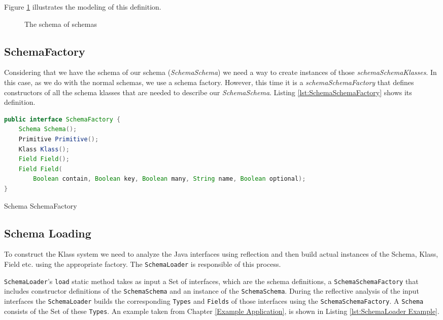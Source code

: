 Figure \ref{fig:SchemaSchema_definition} illustrates the modeling of this definition.

\begin{figure}[H]
	\centering
  	\caption{The schema of schemas}
  	\label{fig:SchemaSchema_definition}
\end{figure}

\subsection{SchemaFactory}\label{sec:SchemaFactory}
Considering that we have the schema of our schema (\textit{SchemaSchema}) we need a way to create instances of those \textit{schemaSchemaKlasses}.
In this case, as we do with the normal schemas, we use a schema factory. 
However, this time it is a \textit{schemaSchemaFactory} that defines constructors of all the schema klasses that are needed to describe our \textit{SchemaSchema}.
Listing \ref{lst:SchemaSchemaFactory} shows its definition.

\begin{sourcecode} [H]
	\begin{lstlisting}[language=Java, escapechar=|]
public interface SchemaFactory {
    Schema Schema();
    Primitive Primitive();
    Klass Klass();
    Field Field();
    Field Field(
    	Boolean contain, Boolean key, Boolean many, String name, Boolean optional);
}
	\end{lstlisting}
	\caption{Schema SchemaFactory}
	\label{lst:SchemaSchemaFactory}
\end{sourcecode}

\subsection{Schema Loading}\label{sec:Schema Loading}
To construct the Klass system we need to analyze the Java interfaces using reflection and then build actual instances of the Schema, Klass, Field etc. using the appropriate factory.
The \texttt{SchemaLoader} is responsible of this process.

\texttt{SchemaLoader}'s \texttt{load} static method takes as input a Set of interfaces, which are the schema definitions, a \texttt{SchemaSchemaFactory} that includes constructor definitions of the \texttt{SchemaSchema} and an instance of the \texttt{SchemaSchema}.
During the reflective analysis of the input interfaces the \texttt{SchemaLoader} builds the corresponding \texttt{Types} and \texttt{Fields} of those interfaces using the \texttt{SchemaSchemaFactory}.
A \texttt{Schema} consists of the Set of these \texttt{Types}.
An example taken from Chapter \ref{Example Application}, is shown in Listing \ref{lst:SchemaLoader Example}.

